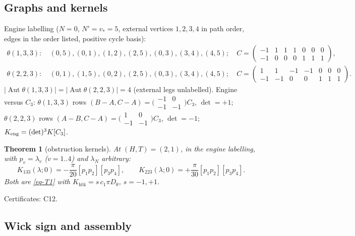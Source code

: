 \documentclass[10pt,a4paper]{article}
\numberwithin{equation}{section}
\newtheorem{theorem}{Theorem}[section]
\theoremstyle{definition}
\theoremstyle{remark}
\newcommand{\Aut}{\operatorname{Aut}}
\newcommand{\htk}{\mathrm{htk}}
\newcommand{\cert}[1]{\par\noindent\textup{Certificates: #1.}\par}
\begin{document}
\subsection{Graphs and kernels}\label{sec-graphs}

Engine labelling ($N=0$, $N'=v_*=5$, external vertices $1,2,3,4$ in path order, edges in the order listed, positive cycle basis):
\begin{align}
\theta(1,3,3):&\ (0,5),(0,1),(1,2),(2,5),(0,3),(3,4),(4,5);\quad C=\begin{pmatrix}-1&1&1&1&0&0&0\\-1&0&0&0&1&1&1\end{pmatrix},\\
\theta(2,2,3):&\ (0,1),(1,5),(0,2),(2,5),(0,3),(3,4),(4,5);\quad C=\begin{pmatrix}1&1&-1&-1&0&0&0\\-1&-1&0&0&1&1&1\end{pmatrix}.
\end{align}
$|\Aut\theta(1,3,3)|=|\Aut\theta(2,2,3)|=4$ (external legs unlabelled). Engine versus $C_3$: $\theta(1,3,3)$ rows $(B-A,C-A)=\big(\begin{smallmatrix}-1&0\\-1&-1\end{smallmatrix}\big)C_3$, $\det=+1$; $\theta(2,2,3)$ rows $(A-B,C-A)=\big(\begin{smallmatrix}1&0\\-1&-1\end{smallmatrix}\big)C_3$, $\det=-1$; $K_{\rm eng}=(\det)^3K[C_3]$.

\begin{theorem}[obstruction kernels]\label{thm-kernels}
At $(H,T)=(2,1)$, in the engine labelling, with $p_v=\lambda_v$ ($v=1..4$) and $\lambda_N$ arbitrary:
\begin{equation}
K_{133}(\lambda;0)=-\frac{\pi}{20}[p_1p_2][p_3p_4],\qquad K_{223}(\lambda;0)=+\frac{\pi}{30}[p_1p_2][p_3p_4].
\end{equation}
Both are \eqref{eq-T1} with $K_\htk=s\,c_1\pi D_\theta$, $s=-1,+1$.
\end{theorem}
\cert{C12}

\subsection{Wick sign and assembly}\label{sec-wick}
\end{document}
